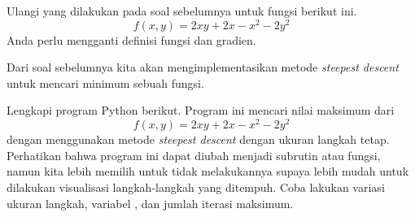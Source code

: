 \begin{soal}
Ulangi yang dilakukan pada soal sebelumnya untuk fungsi berikut ini.
\begin{equation*}
f(x,y) = 2xy + 2x - x^2 - 2y^2
\end{equation*}
Anda perlu mengganti definisi fungsi dan gradien.
\end{soal}

Dari soal sebelumnya kita akan mengimplementasikan metode \textit{steepest descent}
untuk mencari minimum sebuah fungsi.

\begin{soal}
Lengkapi program Python berikut. Program ini
mencari nilai maksimum dari
\begin{equation*}
f(x,y) = 2xy + 2x - x^2 - 2y^2
\end{equation*}
dengan menggunakan metode \textit{steepest descent} dengan ukuran langkah tetap.
Perhatikan bahwa program ini dapat diubah menjadi subrutin atau fungsi, namun
kita lebih memilih untuk tidak melakukannya supaya lebih mudah untuk dilakukan
visualisasi langkah-langkah yang ditempuh.
Coba lakukan variasi ukuran langkah, variabel ,
dan jumlah iterasi maksimum.
\end{soal}

